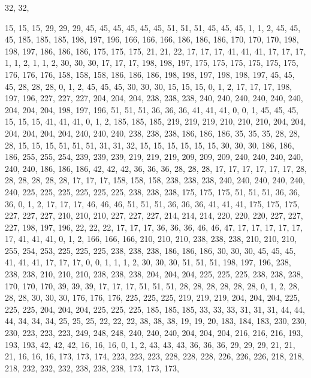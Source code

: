 32, 32,

15, 15, 15, 29, 29, 29, 45, 45, 45, 45, 45, 45, 51, 51, 51, 45, 45, 45, 1, 1, 2, 45, 45, 45, 185, 185, 185, 198, 197, 196, 166, 166,
166, 186, 186, 186, 170, 170, 170, 198, 198, 197, 186, 186, 186, 175, 175, 175, 21, 21, 22, 17, 17, 17, 41, 41, 41, 17, 17, 17, 1, 1, 2, 1,
1, 2, 30, 30, 30, 17, 17, 17, 198, 198, 197, 175, 175, 175, 175, 175, 175, 176, 176, 176, 158, 158, 158, 186, 186, 186, 198, 198, 197, 198, 198, 197,
45, 45, 45, 28, 28, 28, 0, 1, 2, 45, 45, 45, 30, 30, 30, 15, 15, 15, 0, 1, 2, 17, 17, 17, 198, 197, 196, 227, 227, 227, 204, 204,
204, 238, 238, 238, 240, 240, 240, 240, 240, 240, 204, 204, 204, 198, 197, 196, 51, 51, 51, 36, 36, 36, 41, 41, 41, 0, 0, 1, 45, 45, 45, 15,
15, 15, 41, 41, 41, 0, 1, 2, 185, 185, 185, 219, 219, 219, 210, 210, 210, 204, 204, 204, 204, 204, 204, 240, 240, 240, 238, 238, 238, 186, 186, 186,
35, 35, 35, 28, 28, 28, 15, 15, 15, 51, 51, 51, 31, 31, 32, 15, 15, 15, 15, 15, 15, 30, 30, 30, 186, 186, 186, 255, 255, 254, 239, 239,
239, 219, 219, 219, 209, 209, 209, 240, 240, 240, 240, 240, 240, 186, 186, 186, 42, 42, 42, 36, 36, 36, 28, 28, 28, 17, 17, 17, 17, 17, 17, 28,
28, 28, 28, 28, 28, 17, 17, 17, 158, 158, 158, 238, 238, 238, 240, 240, 240, 240, 240, 240, 225, 225, 225, 225, 225, 225, 238, 238, 238, 175, 175, 175,
51, 51, 51, 36, 36, 36, 0, 1, 2, 17, 17, 17, 46, 46, 46, 51, 51, 51, 36, 36, 36, 41, 41, 41, 175, 175, 175, 227, 227, 227, 210, 210,
210, 227, 227, 227, 214, 214, 214, 220, 220, 220, 227, 227, 227, 198, 197, 196, 22, 22, 22, 17, 17, 17, 36, 36, 36, 46, 46, 47, 17, 17, 17, 17,
17, 17, 41, 41, 41, 0, 1, 2, 166, 166, 166, 210, 210, 210, 238, 238, 238, 210, 210, 210, 255, 254, 253, 225, 225, 225, 238, 238, 238, 186, 186, 186,
30, 30, 30, 45, 45, 45, 41, 41, 41, 17, 17, 17, 0, 0, 1, 1, 1, 2, 30, 30, 30, 51, 51, 51, 198, 197, 196, 238, 238, 238, 210, 210,
210, 238, 238, 238, 204, 204, 204, 225, 225, 225, 238, 238, 238, 170, 170, 170, 39, 39, 39, 17, 17, 17, 51, 51, 51, 28, 28, 28, 28, 28, 28, 0,
1, 2, 28, 28, 28, 30, 30, 30, 176, 176, 176, 225, 225, 225, 219, 219, 219, 204, 204, 204, 225, 225, 225, 204, 204, 204, 225, 225, 225, 185, 185, 185,
33, 33, 33, 31, 31, 31, 44, 44, 44, 34, 34, 34, 25, 25, 25, 22, 22, 22, 38, 38, 38, 19, 19, 20, 183, 184, 183, 230, 230, 230, 223, 223,
223, 249, 248, 248, 240, 240, 240, 204, 204, 204, 216, 216, 216, 193, 193, 193, 42, 42, 42, 16, 16, 16, 0, 1, 2, 43, 43, 43, 36, 36, 36, 29,
29, 29, 21, 21, 21, 16, 16, 16, 173, 173, 174, 223, 223, 223, 228, 228, 228, 226, 226, 226, 218, 218, 218, 232, 232, 232, 238, 238, 238, 173, 173, 173,

